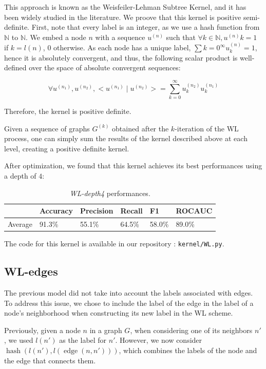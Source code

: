 \documentclass{IEEEtran}
\begin{document}
This approach is known as the Weisfeiler-Lehman Subtree Kernel, and it has been widely studied in the literature.
We proove that this kernel is positive semi-definite.
First, note that every label is an integer,
as we use a hash function from $\mathbb N $ to $\mathbb N $.
We embed a node $n$ with a sequence $u^{(n)}$ such that
$\forall k \in \mathbb{N}, u^{(n)}k = 1$ if $k = l(n)$, 0 otherwise.
As each node has a unique label, $\sum{k=0}^\infty u^{(n)}_k = 1$,
hence it is absolutely convergent, and thus, the following scalar product is well-defined over the space of absolute convergent sequences:

\begin{equation*}
    \forall u^{(n_1)}, u^{(n_2)}, < u^{(n_1)} \; | \; u^{(n_2)} > =
    \sum_{k=0}^\infty u^{(n_2)}_k u^{(n_1)}_k
\end{equation*}

Therefore, the kernel is positive definite.

Given a sequence of graphs $G^{(k)}$ obtained after the $k$-iteration of the WL process,
one can simply sum the results of the kernel described above at each level, creating a positive definite kernel.

After optimization, we found that this kernel achieves its best performances using a depth of $4$:

\begin{table}[h]
    \centering
    \begin{tabular}{l|llll|l}
                & Accuracy & Precision & Recall & F1     & ROCAUC \\
        \hline
        Average & 91.3\%   & 55.1\%    & 64.5\% & 58.0\% & 89.0\% \\
    \end{tabular}
    \caption{\emph{WL-depth4} performances.}
    \label{tab:wldepth4}
\end{table}

The code for this kernel is available in our repository : \texttt{kernel/WL.py}.

\subsection{WL-edges}
The previous model did not take into account the labels associated with edges. To address this issue, we chose to include the label of the edge in the label of a node's neighborhood when constructing its new label in the WL scheme.

Previously, given a node $n$ in a graph $G$, when considering one of its neighbors $n'$, we used $l(n')$ as the label for $n'$. However, we now consider $\operatorname*{hash}(l(n'), l(\operatorname{edge}(n, n')))$, which combines the labels of the node and the edge that connects them.
\end{document}
